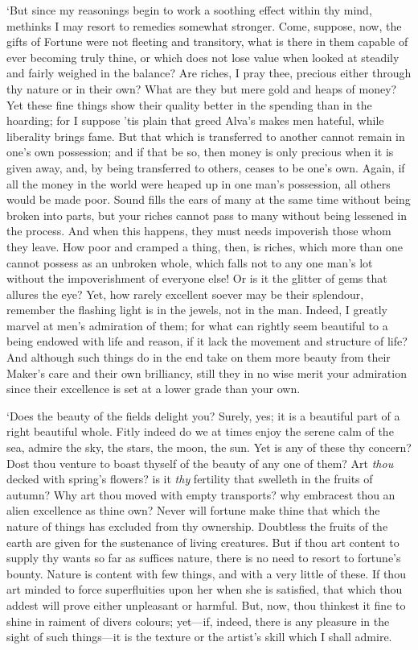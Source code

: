 \documentclass[11pt]{book}
\begin{document}
`But since my reasonings begin to work a soothing effect within thy
mind, methinks I may resort to remedies somewhat stronger. Come,
suppose, now, the gifts of Fortune were not fleeting and transitory,
what is there in them capable of ever becoming truly thine, or which
does not lose value when looked at steadily and fairly weighed in the
balance? Are riches, I pray thee, precious either through thy nature or
in their own? What are they but mere gold and heaps of money? Yet these
fine things show their quality better in the spending than in the
hoarding; for I suppose 'tis plain that greed Alva's makes men hateful,
while liberality brings fame. But that which is transferred to another
cannot remain in one's own possession; and if that be so, then money is
only precious when it is given away, and, by being transferred to
others, ceases to be one's own. Again, if all the money in the world
were heaped up in one man's possession, all others would be made poor.
Sound fills the ears of many at the same time without being broken into
parts, but your riches cannot pass to many without being lessened in the
process. And when this happens, they must needs impoverish those whom
they leave. How poor and cramped a thing, then, is riches, which more
than one cannot possess as an unbroken whole, which falls not to any one
man's lot without the impoverishment of everyone else! Or is it the
glitter of gems that allures the eye? Yet, how rarely excellent soever
may be their splendour, remember the flashing light is in the jewels,
not in the man. Indeed, I greatly marvel at men's admiration of them;
for what can rightly seem beautiful to a being endowed with life and
reason, if it lack the movement and structure of life? And although such
things do in the end take on them more beauty from their Maker's care
and their own brilliancy, still they in no wise merit your admiration
since their excellence is set at a lower grade than your own.

`Does the beauty of the fields delight you? Surely, yes; it is a
beautiful part of a right beautiful whole. Fitly indeed do we at times
enjoy the serene calm of the sea, admire the sky, the stars, the moon,
the sun. Yet is any of these thy concern? Dost thou venture to boast
thyself of the beauty of any one of them? Art \emph{thou} decked with
spring's flowers? is it \emph{thy} fertility that swelleth in the fruits of
autumn? Why art thou moved with empty transports? why embracest thou an
alien excellence as thine own? Never will fortune make thine that which
the nature of things has excluded from thy ownership. Doubtless the
fruits of the earth are given for the sustenance of living creatures.
But if thou art content to supply thy wants so far as suffices nature,
there is no need to resort to fortune's bounty. Nature is content with
few things, and with a very little of these. If thou art minded to force
superfluities upon her when she is satisfied, that which thou addest
will prove either unpleasant or harmful. But, now, thou thinkest it
fine to shine in raiment of divers colours; yet---if, indeed, there is
any pleasure in the sight of such things---it is the texture or the
artist's skill which I shall admire.
\end{document}

